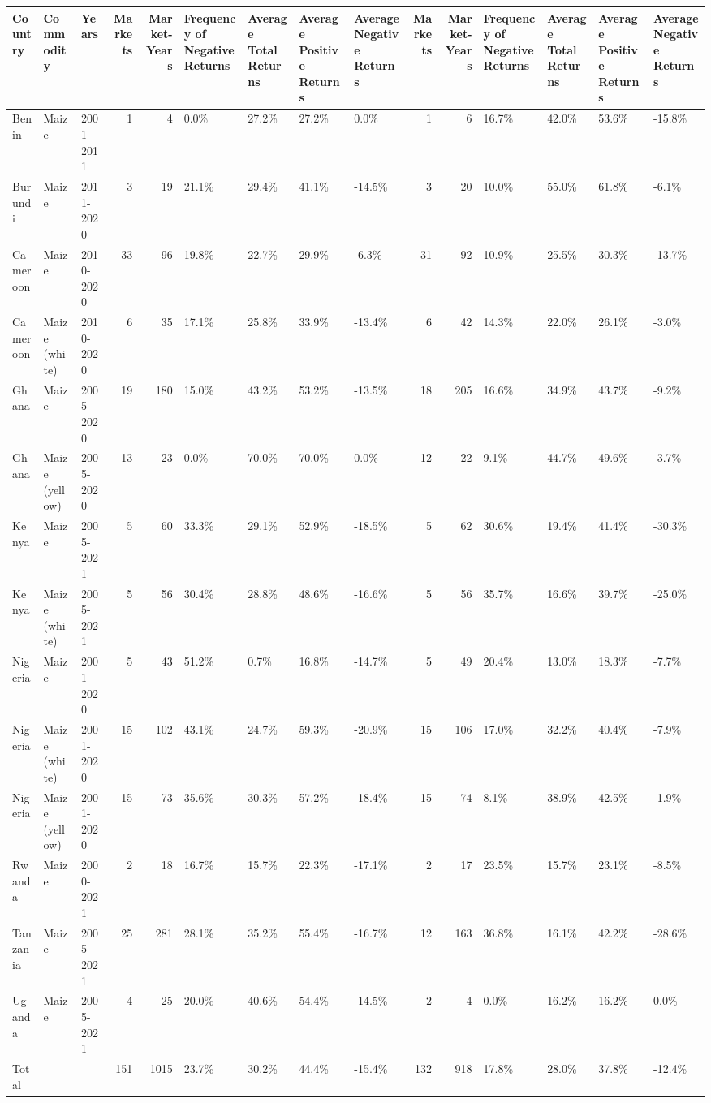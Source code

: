 \begin{table}[ht]
\centering
\begin{tabular}{lllrrllllrrllll}
  \hline
Country & Commodity & Years & Markets & Market-Years & Frequency of Negative Returns & Average Total Returns & Average Positive Returns & Average Negative Returns & Markets & Market-Years & Frequency of Negative Returns & Average Total Returns & Average Positive Returns & Average Negative Returns \\ 
  \hline
Benin & Maize & 2001-2011 &   1 &   4 & 0.0\% & 27.2\% & 27.2\% & 0.0\% &   1 &   6 & 16.7\% & 42.0\% & 53.6\% & -15.8\% \\ 
  Burundi & Maize & 2011-2020 &   3 &  19 & 21.1\% & 29.4\% & 41.1\% & -14.5\% &   3 &  20 & 10.0\% & 55.0\% & 61.8\% & -6.1\% \\ 
  Cameroon & Maize & 2010-2020 &  33 &  96 & 19.8\% & 22.7\% & 29.9\% & -6.3\% &  31 &  92 & 10.9\% & 25.5\% & 30.3\% & -13.7\% \\ 
  Cameroon & Maize (white) & 2010-2020 &   6 &  35 & 17.1\% & 25.8\% & 33.9\% & -13.4\% &   6 &  42 & 14.3\% & 22.0\% & 26.1\% & -3.0\% \\ 
  Ghana & Maize & 2005-2020 &  19 & 180 & 15.0\% & 43.2\% & 53.2\% & -13.5\% &  18 & 205 & 16.6\% & 34.9\% & 43.7\% & -9.2\% \\ 
  Ghana & Maize (yellow) & 2005-2020 &  13 &  23 & 0.0\% & 70.0\% & 70.0\% & 0.0\% &  12 &  22 & 9.1\% & 44.7\% & 49.6\% & -3.7\% \\ 
  Kenya & Maize & 2005-2021 &   5 &  60 & 33.3\% & 29.1\% & 52.9\% & -18.5\% &   5 &  62 & 30.6\% & 19.4\% & 41.4\% & -30.3\% \\ 
  Kenya & Maize (white) & 2005-2021 &   5 &  56 & 30.4\% & 28.8\% & 48.6\% & -16.6\% &   5 &  56 & 35.7\% & 16.6\% & 39.7\% & -25.0\% \\ 
  Nigeria & Maize & 2001-2020 &   5 &  43 & 51.2\% & 0.7\% & 16.8\% & -14.7\% &   5 &  49 & 20.4\% & 13.0\% & 18.3\% & -7.7\% \\ 
  Nigeria & Maize (white) & 2001-2020 &  15 & 102 & 43.1\% & 24.7\% & 59.3\% & -20.9\% &  15 & 106 & 17.0\% & 32.2\% & 40.4\% & -7.9\% \\ 
  Nigeria & Maize (yellow) & 2001-2020 &  15 &  73 & 35.6\% & 30.3\% & 57.2\% & -18.4\% &  15 &  74 & 8.1\% & 38.9\% & 42.5\% & -1.9\% \\ 
  Rwanda & Maize & 2000-2021 &   2 &  18 & 16.7\% & 15.7\% & 22.3\% & -17.1\% &   2 &  17 & 23.5\% & 15.7\% & 23.1\% & -8.5\% \\ 
  Tanzania & Maize & 2005-2021 &  25 & 281 & 28.1\% & 35.2\% & 55.4\% & -16.7\% &  12 & 163 & 36.8\% & 16.1\% & 42.2\% & -28.6\% \\ 
  Uganda & Maize & 2005-2021 &   4 &  25 & 20.0\% & 40.6\% & 54.4\% & -14.5\% &   2 &   4 & 0.0\% & 16.2\% & 16.2\% & 0.0\% \\ 
  Total &   &   & 151 & 1015 & 23.7\% & 30.2\% & 44.4\% & -15.4\% & 132 & 918 & 17.8\% & 28.0\% & 37.8\% & -12.4\% \\ 
   \hline
\end{tabular}
\end{table}
